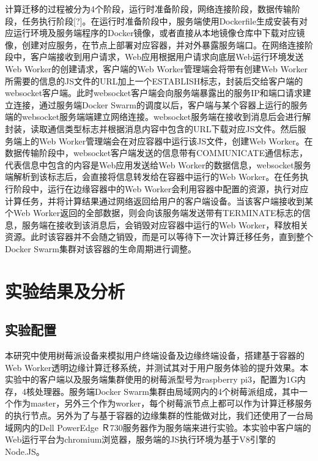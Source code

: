 计算迁移的过程被分为4个阶段，运行时准备阶段，网络连接阶段，数据传输阶段，任务执行阶段[?]。在运行时准备阶段中，服务端使用Dockerfile生成安装有对应运行环境及服务端程序的Docker镜像，或者直接从本地镜像仓库中下载对应镜像，创建对应服务，在节点上部署对应容器，并对外暴露服务端口。在网络连接阶段中，客户端接收到用户请求，Web应用根据用户请求向底层Web运行环境发送Web Worker的创建请求，客户端的Web Worker管理端会将带有创建Web Worker所需要的信息的JS文件的URL加上一个ESTABLISH标志，封装后交给客户端的websocket客户端。此时websocket客户端会向服务端暴露出的服务IP和端口请求建立连接，通过服务端Docker Swarm的调度以后，客户端与某个容器上运行的服务端的websocket服务端端建立网络连接。websocket服务端在接收到消息后会进行解封装，读取通信类型标志并根据消息内容中包含的URL下载对应JS文件。然后服务端上的Web Worker管理端会在对应容器中运行该JS文件，创建Web Worker。在数据传输阶段中，websocket客户端发送的信息带有COMMUNICATE通信标志，代表信息中包含的内容是Web应用发送给Web Worker的数据信息，websocket服务端解析到该标志后，会直接将信息转发给在容器中运行的Web Worker。在任务执行阶段中，运行在边缘容器中的Web Worker会利用容器中配置的资源，执行对应计算任务，并将计算结果通过网络返回给用户的客户端设备。当该客户端接收到某个Web Worker返回的全部数据，则会向该服务端发送带有TERMINATE标志的信息，服务端在接收到该消息后，会销毁对应容器中运行的Web Worker，释放相关资源。此时该容器并不会随之销毁，而是可以等待下一次计算迁移任务，直到整个Docker Swarm集群对该容器的生命周期进行调整。

\section{实验结果及分析}

\subsection{实验配置}

本研究中使用树莓派设备来模拟用户终端设备及边缘终端设备，搭建基于容器的Web Worker透明边缘计算迁移系统，并测试其对于用户服务体验的提升效果。本实验中的客户端以及服务端集群使用的树莓派型号为raspberry pi3，配置为1G内存，4核处理器。服务端Docker Swarm集群由局域网内的4个树莓派组成，其中一个作为master，另外三个作为worker，每个树莓派节点上都可以作为计算迁移服务的执行节点。另外为了与基于容器的边缘集群的性能做对比，我们还使用了一台局域网内的Dell PowerEdge Ｒ730服务器作为服务端来进行实验。本实验中客户端的Web运行平台为chromium浏览器，服务端的JS执行环境为基于V8引擎的Node.JS。

